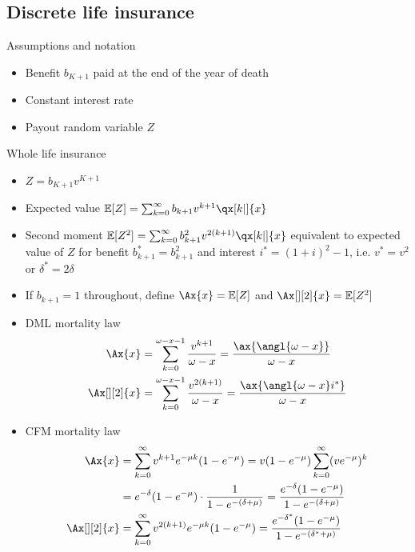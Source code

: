 \subsection{Discrete life insurance}

Assumptions and notation
\begin{itemize}
\item Benefit $b_{K + 1}$ paid at the end of the year of death
\item Constant interest rate
\item Payout random variable $Z$
\end{itemize}

Whole life insurance
\begin{itemize}
\item $Z = b_{K + 1}v^{K + 1}$
\item Expected value $\mathbb{E}[Z] = \sum_{k = 0}^{\infty} b_{k + 1}v^{k + 1}\qx[k|]{x}$
\item Second moment $\mathbb{E}[Z^2] = \sum_{k = 0}^{\infty} b_{k + 1}^2v^{2(k + 1)}\qx[k|]{x}$ equivalent to expected value of $Z$ for benefit $b_{k + 1}^{*} = b_{k + 1}^2$ and interest $i^{*} = (1 + i)^2 - 1$, i.e. $v^{*} = v^2$ or $\delta^{*} = 2\delta$
\item If $b_{k + 1} = 1$ throughout, define $\Ax{x} = \mathbb{E}[Z]$ and $\Ax[][2]{x} = \mathbb{E}[Z^2]$
\item DML mortality law
\begin{align*}
\Ax{x} &= \sum_{k = 0}^{\omega - x - 1}\frac{v^{k + 1}}{\omega - x} = \frac{\ax{\angl{\omega - x}}}{\omega - x} \\
\Ax[][2]{x} &= \sum_{k = 0}^{\omega - x - 1}\frac{v^{2(k + 1)}}{\omega - x} = \frac{\ax{\angl{\omega - x}i^{*}}}{\omega - x}
\end{align*}
\item CFM mortality law
\begin{align*}
\Ax{x} &= \sum_{k = 0}^{\infty} v^{k + 1}e^{-\mu k}(1 - e^{-\mu}) = v(1 - e^{-\mu})\sum_{k = 0}^{\infty} (ve^{-\mu})^k \\
&= e^{-\delta}(1 - e^{-\mu})\cdot\frac{1}{1 - e^{-(\delta + \mu)}} = \frac{e^{-\delta}(1 - e^{-\mu})}{1 - e^{-(\delta + \mu)}} \\
\Ax[][2]{x} &= \sum_{k = 0}^{\infty} v^{2(k + 1)}e^{-\mu k}(1 - e^{-\mu}) = \frac{e^{-\delta^{*}}(1 - e^{-\mu})}{1 - e^{-(\delta^{*} + \mu)}}
\end{align*}
\end{itemize}

